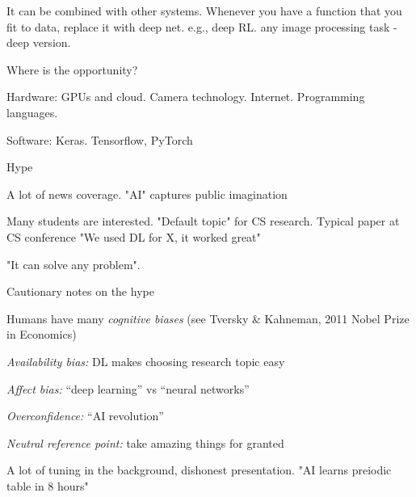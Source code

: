 \documentclass[english]{article}
\begin{document}
It can be combined with other systems. Whenever you have a function that you fit to data, replace it with deep net. e.g., deep RL. any image processing task - deep version. 

Where is the opportunity?


\eitem





\item Hardware: GPUs and cloud. Camera technology. Internet. Programming languages.

\item Software:  Keras. Tensorflow, PyTorch

\item Hype

\bitem
\item A lot of news coverage. "AI" captures public imagination %
\item Many students are interested. "Default topic" for CS research. Typical paper at CS conference "We used DL for X, it worked great"

\item "It can solve any problem". 
\eitem


\item Cautionary notes on the hype

\bitem
\item Humans have many \emph{cognitive biases} (see Tversky \& Kahneman, 2011 Nobel Prize in Economics)
\item \emph{Availability bias:} DL makes choosing research topic easy
\item \emph{Affect bias:} ``deep learning'' vs ``neural networks'' %
\item \emph{Overconfidence:} ``AI revolution''
\item \emph{Neutral reference point:} take amazing things for granted
\item A lot of tuning in the background, dishonest presentation. "AI learns preiodic table in 8 hours"
\end{document}
